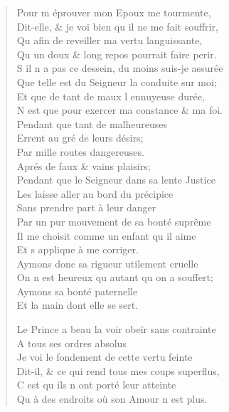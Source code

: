 \begin{verse}
\vin Pour m\textquotesingle{} éprouver mon Epoux me tourmente, \\
Dit-elle, \& je voi bien qu\textquotesingle{} il ne me fait souffrir, \\
Qu\textquotesingle{} afin de reveiller ma vertu languissante, \\
Qu\textquotesingle{} un doux \& long repos pourrait faire perir. \\
S\textquotesingle{} il n\textquotesingle{} a pas ce dessein, du moins suis-je assurée \\
Que telle est du Seigneur la conduite sur moi; \\
Et que de tant de maux l\textquotesingle{} ennuyeuse durée, \\
N\textquotesingle{} est que pour exercer ma constance \& ma foi. \\
\vin Pendant que tant de malheureuses \\
\vin Errent au gré de leurs désirs; \\
\vin Par mille routes dangereuses. \\
\vin Aprés de faux \& vains plaisirs; \\
Pendant que le Seigneur dans sa lente Justice \\
\vin Les laisse aller au bord du précipice \\
\vin Sans prendre part à leur danger \\
Par un pur mouvement de sa bonté suprême \\
\vin Il me choisit comme un enfant qu\textquotesingle{} il aime \\
\vin Et s\textquotesingle{} applique à me corriger. \\
Aymons donc sa rigueur utilement cruelle \\
\vin On n\textquotesingle{} est heureux qu\textquotesingle{} autant qu\textquotesingle{} on a souffert; \\
\vin Aymons sa bonté paternelle \\
\vin Et la main dont elle se sert.

Le Prince a beau la voir obeïr sans contrainte \\
\vin A tous ses ordres absolus \\
Je voi le fondement de cette vertu feinte \\
Dit-il, \& ce qui rend tous mes coups superflus, \\
\vin C\textquotesingle{} est qu\textquotesingle{} ils n\textquotesingle{} ont porté leur atteinte \\
\vin Qu\textquotesingle{} à des endroits où son Amour n\textquotesingle{} est plus.


\end{verse}
